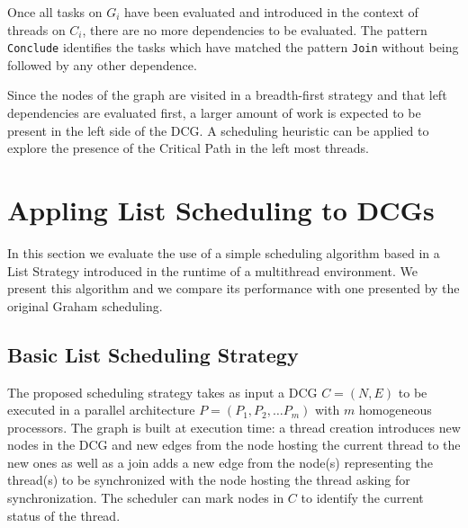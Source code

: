 \documentclass[twocolumn]{svjour3}
\begin{document}
Once all tasks on $G_i$ have been evaluated and introduced in the context of threads on $C_i$, there are no more dependencies to be evaluated. The pattern \verb+Conclude+ identifies the tasks which have matched the pattern \verb+Join+ without being followed by any other dependence.

Since the nodes of the graph are visited in a breadth-first strategy and that left dependencies are evaluated first, a larger amount of work is expected to be present in the left side of the DCG. A scheduling heuristic can be applied to explore the presence of the Critical Path in the left most threads.

\section{Appling List Scheduling to DCGs}\label{sec:evaluation}

In this section we evaluate the use of a simple scheduling algorithm based in a List Strategy introduced in the runtime of a multithread environment. We present this algorithm and we compare its performance with one presented by the original Graham scheduling. 

\subsection{Basic List Scheduling Strategy}\label{sec:schedalgo}

The proposed scheduling strategy takes as input a DCG $C = (N,E)$ to be executed in a parallel architecture $P = (P_1, P_2, \dots P_m)$ with $m$ homogeneous processors. The graph is built at execution time: a thread creation introduces new nodes in the DCG and new edges from the node hosting the current thread to the new ones as well as a join adds a new edge from the node(s) representing the thread(s) to be synchronized with the node hosting the thread asking for synchronization. The scheduler can mark nodes in $C$ to identify the current status of the thread.
\end{document}
